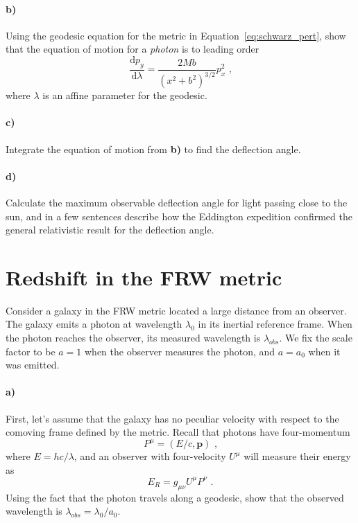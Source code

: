 \documentclass[12pt]{article}
\newcommand\diff{\mathrm{d}}
\begin{document}
\paragraph{b)} Using the geodesic equation for the metric in
Equation~\ref{eq:schwarz_pert}, show that the equation of motion for a \emph{photon} is to leading order
\begin{equation}
    \frac{\diff p_y}{\diff \lambda}
    = \frac{2 M b}{\left(x^2 + b^2\right)^{3/2}} p_x^2 \text{ ,}
\end{equation}
where $\lambda$ is an affine parameter for the geodesic.

\paragraph{c)} Integrate the equation of motion from \textbf{b)} to find the
deflection angle.

\paragraph{d)} Calculate the maximum observable deflection angle for light passing close to the sun, and in a few sentences describe how the Eddington expedition confirmed the general relativistic result for the deflection angle.

\section{Redshift in the FRW metric}

Consider a galaxy in the FRW metric located a large distance from an observer.
The galaxy emits a photon at wavelength $\lambda_0$ in its inertial reference
frame. When the photon reaches the observer, its measured wavelength is
$\lambda_{obs}$. We fix the scale factor to be $a=1$ when the observer measures
the photon, and $a=a_0$ when it was emitted.

\paragraph{a)} First, let's assume that the galaxy has no peculiar velocity with
respect to the comoving frame defined by the metric. Recall that photons have
four-momentum
\begin{equation}
    P^\mu = \left(E / c, \mathbf{p}\right) \text{ ,}
\end{equation}
where $E = hc / \lambda$, and an observer with four-velocity $U^\mu$ will
measure their energy as
\begin{equation}
    E_R = g_{\mu \nu} U^\mu P^\nu \text{ .}
\end{equation}
Using the fact that the photon travels along a
geodesic, show that the observed wavelength is $\lambda_{obs} = \lambda_0 /
a_0$.
\end{document}
